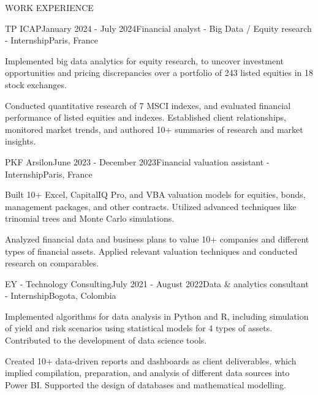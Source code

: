 \documentclass{resume} %
\begin{document}
\begin{rSection}{WORK EXPERIENCE}

    \vspace{0.3em}
    \begin{rSubsection}{TP ICAP}{January 2024 - July 2024}{Financial analyst - Big Data / Equity research - Internship}{Paris, France}
        \item Implemented big data analytics for equity research, to uncover investment opportunities and pricing discrepancies over a portfolio of 243 listed equities in 18 stock exchanges. %
        \item Conducted quantitative research of 7 MSCI indexes, and evaluated financial performance of listed equities and indexes. Established client relationships, monitored market trends, and authored 10+ summaries of research and market insights.
    \end{rSubsection}
    
    \begin{rSubsection}{PKF Arsilon}{June 2023 - December 2023}{Financial valuation assistant - Internship}{Paris, France}
        \item Built 10+ Excel, CapitalIQ Pro, and VBA valuation models for equities, bonds, management packages, and other contracts. Utilized advanced techniques like trinomial trees and Monte Carlo simulations.
        \item Analyzed financial data and business plans to value 10+ companies and different types of financial assets. Applied relevant valuation techniques and conducted research on comparables. %
    \end{rSubsection}
    
    \begin{rSubsection}{EY - Technology Consulting}{July 2021 - August 2022}{Data \& analytics consultant - Internship}{Bogota, Colombia}
        \item Implemented algorithms for data analysis in Python and R, including simulation of yield and risk scenarios using statistical models for 4 types of assets. Contributed to the development of data science tools.
        \item Created 10+ data-driven reports and dashboards as client deliverables, which implied compilation, preparation, and analysis of different data sources into Power BI. Supported the design of databases and mathematical modelling.
    \end{rSubsection}
    \end{rSection}
    
\end{document}
